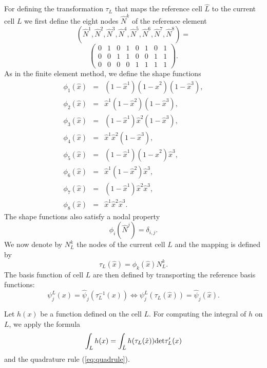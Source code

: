 \documentclass[preprint]{sig-alternate}
\begin{document}
For defining the transformation $\tau_L$ that maps the reference cell $\hat L$ to the current cell $L$ we first define the eight nodes $\hat N^k$  of the reference element
$$(\hat{N}^{1},\hat{N}^{2},\hat{N}^{3},\hat{N}^{4},\hat{N}^{5},\hat{N}^{6},\hat{N}^{7},\hat{N}^{8})=$$
$$\left(\begin{array}{cccccccc}
0 & 1 & 0 & 1 & 0 & 1 & 0 & 1\\
0 & 0 & 1 & 1 & 0 & 0 & 1 & 1\\
0 & 0 & 0 & 0 & 1 & 1 & 1 & 1
\end{array}\right).
$$
As in the finite element method, we define the shape functions
\begin{eqnarray*}
\phi_{1}(\hat{x}) & = & (1-\hat{x}^{1})(1-\hat{x}^{2})(1-\hat{x}^{3}),\\
\phi_{2}(\hat{x}) & = & \hat{x}^{1}(1-\hat{x}^{2})(1-\hat{x}^{3}),\\
\phi_{3}(\hat{x}) & = & (1-\hat{x}^{1})\hat{x}^{2}(1-\hat{x}^{3}),\\
\phi_{4}(\hat{x}) & = & \hat{x}^{1}\hat{x}^{2}(1-\hat{x}^{3}),\\
\phi_{5}(\hat{x}) & = & (1-\hat{x}^{1})(1-\hat{x}^{2})\hat{x}^{3},\\
\phi_{6}(\hat{x}) & = & \hat{x}^{1}(1-\hat{x}^{2})\hat{x}^{3},\\
\phi_{7}(\hat{x}) & = & (1-\hat{x}^{1})\hat{x}^{2}\hat{x}^{3},\\
\phi_{8}(\hat{x}) & = & \hat{x}^{1}\hat{x}^{2}\hat{x}^{3}.
\end{eqnarray*}
The shape functions also satisfy a nodal property $$ \phi_i(\hat N^j)=\delta_{i,j}.$$ We now denote by $N_L^k$ the nodes of the current cell $L$ and the mapping is defined by
$$ \tau_L(\hat x)=\phi_k(\hat x)N_L^k .$$The basis function of cell $L$ are then defined by transporting the reference basis functions:
$$
\psi_j^L(x)=\hat \psi_j(\tau_L^{-1}(x)) \Leftrightarrow \psi_j^L(\tau_L(\hat x))=\hat \psi_j(\hat x).
$$


Let $h(x)$ be a function defined on the cell $L$. For computing the integral of $h$ on $L$, we apply the formula
$$
\int_L h(x) = \int_{\hat L} h(\tau_L(\hat x)) \hbox{det} \tau'_L(x)
$$
and the quadrature rule (\ref{eq:quadrule}).
\end{document}
